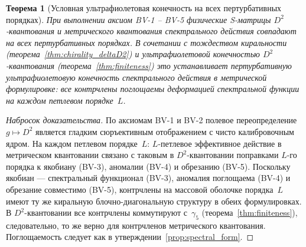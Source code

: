 \documentclass[12pt,a4paper]{article}
\newtheorem{theorem}{Теорема}[section]
\theoremstyle{definition}
\theoremstyle{remark}
\begin{document}
\begin{theorem}[Условная ультрафиолетовая конечность на всех пертурбативных порядках]
\label{thm:conditional_uv}
При выполнении аксиом BV-1 -- BV-5 физические S-матрицы
$D^2$-квантования и метрического квантования спектрального действия
совпадают на всех пертурбативных порядках.  В сочетании с тождеством
киральности (теорема~\ref{thm:chirality_deltaD2}) и ультрафиолетовой
конечностью $D^2$-квантования (теорема~\ref{thm:finiteness}) это
устанавливает пертурбативную ультрафиолетовую конечность спектрального
действия в метрической формулировке: все контрчлены поглощаемы
деформацией спектральной функции на каждом петлевом порядке~$L$.
\end{theorem}

\begin{proof}[Набросок доказательства]
По аксиомам BV-1 и BV-2 полевое переопределение $g \mapsto D^2$
является гладким сюръективным отображением с чисто калибровочным ядром.
На каждом петлевом порядке~$L$: $L$-петлевое эффективное действие в
метрическом квантовании связано с таковым в $D^2$-квантовании
поправками $L$-го порядка к якобиану (BV-3), аномалии (BV-4) и
обрезанию (BV-5).  Поскольку якобиан --- спектральный функционал
(BV-3), аномалия поглощаема (BV-4) и обрезание совместимо (BV-5),
контрчлены на массовой оболочке порядка~$L$ имеют ту же киральную
блочно-диагональную структуру в обеих формулировках.
В $D^2$-квантовании все контрчлены коммутируют с~$\gamma_5$
(теорема~\ref{thm:finiteness}), следовательно, то же верно для
контрчленов метрического квантования.  Поглощаемость следует как в
утверждении~\ref{prop:spectral_form}.
\end{proof}
\end{document}
